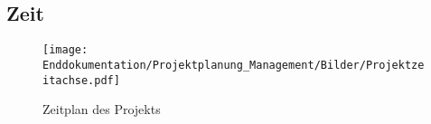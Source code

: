 \begin{landscape}
	\subsection{Zeit}	
	 \begin{figure}[h!]
	    	\texttt{[image: Enddokumentation/Projektplanung\_Management/Bilder/Projektzeitachse.pdf]}
	       	\centering
	       	\caption{Zeitplan des Projekts} 
	        \label{abb:ProjektZeitstrahl}
	    \end{figure}
\end{landscape}